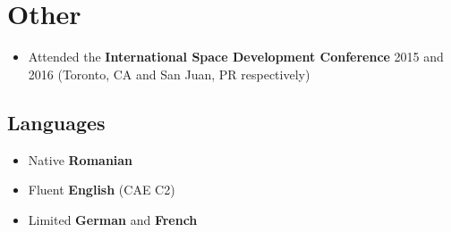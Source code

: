\documentclass[a4paper]{article}
\begin{document}
\section*{Other}
\begin{itemize}
	\item Attended the \textbf{International Space Development Conference} 2015
	      and 2016 (Toronto, CA and San Juan, PR respectively)
\end{itemize}

\subsection*{Languages}
\begin{itemize}
	\item Native \textbf{Romanian}
	\item Fluent \textbf{English} (CAE C2)
	\item Limited \textbf{German} and \textbf{French}
\end{itemize}
\end{document}
